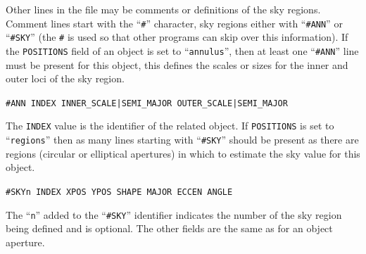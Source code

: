 \documentclass[twoside,11pt,nolof]{starlink}
\providecommand{\ft}[1]{``\texttt{#1}''}
\begin{document}
{{{       Other lines in the file may be comments or definitions of the sky
       regions. Comment lines start with the \ft{\#} character, sky regions
       either with \ft{\#ANN} or \ft{\#SKY} (the \texttt{\#} is used so that other
       programs can skip over this information). If the \texttt{POSITIONS} field
       of an object is set to \ft{annulus}, then at least one \ft{\#ANN} line must
       be present for this object, this defines the scales or sizes for
       the inner and outer loci of the sky region.
       \begin{description}
          \item  \hspace*{1cm} \texttt{\#ANN INDEX INNER\_SCALE|SEMI\_MAJOR OUTER\_SCALE|SEMI\_MAJOR}
       \end{description}
       The \texttt{INDEX} value is the identifier of the related object. If
       \texttt{POSITIONS} is set to \ft{regions} then as many lines
       starting with \ft{\#SKY} should be present as there are
       regions (circular or elliptical apertures) in which to estimate
       the sky value for this object.
       \begin{description}
         \item  \hspace*{1cm}  \texttt{\#SKYn INDEX XPOS YPOS SHAPE MAJOR ECCEN ANGLE}
       \end{description}
       The \ft{n} added to the \ft{\#SKY} identifier indicates
       the number of the sky region being defined and is optional.
       The other fields are the same as for an object aperture.\\

}}}
\end{document}
